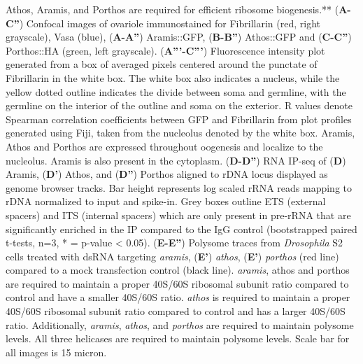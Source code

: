 \documentclass[12pt,oneside]{reedthesis}
\begin{document}
Athos, Aramis, and Porthos are required for efficient
ribosome biogenesis.** (\textbf{A-C''}) Confocal images of ovariole
immunostained for Fibrillarin (red, right grayscale), Vasa (blue),
(\textbf{A-A''}) Aramis::GFP, (\textbf{B-B''}) Athos::GFP and (\textbf{C-C''})
Porthos::HA (green, left grayscale). (\textbf{A'''-C'''}) Fluorescence
intensity plot generated from a box of averaged pixels centered around
the punctate of Fibrillarin in the white box. The white box also
indicates a nucleus, while the yellow dotted outline indicates the
divide between soma and germline, with the germline on the interior of
the outline and soma on the exterior. R values denote Spearman
correlation coefficients between GFP and Fibrillarin from plot profiles
generated using Fiji, taken from the nucleolus denoted by the white box.
Aramis, Athos and Porthos are expressed throughout oogenesis and
localize to the nucleolus. Aramis is also present in the cytoplasm.
(\textbf{D-D''}) RNA IP-seq of (\textbf{D}) Aramis, (\textbf{D'}) Athos, and (\textbf{D''})
Porthos aligned to rDNA locus displayed as genome browser tracks. Bar
height represents log scaled rRNA reads mapping to rDNA normalized to
input and spike-in. Grey boxes outline ETS (external spacers) and ITS
(internal spacers) which are only present in pre-rRNA that are
significantly enriched in the IP compared to the IgG control
(bootstrapped paired t-tests, n=3, * = p-value \textless{} 0.05). (\textbf{E-E''})
Polysome traces from \emph{Drosophila} S2 cells treated with dsRNA targeting
\emph{aramis}, (\textbf{E'}) \emph{athos}, (\textbf{E'}) \emph{porthos} (red line) compared to a
mock transfection control (black line). \emph{aramis}, athos and porthos are
required to maintain a proper 40S/60S ribosomal subunit ratio compared
to control and have a smaller 40S/60S ratio. \emph{athos} is required to
maintain a proper 40S/60S ribosomal subunit ratio compared to control
and has a larger 40S/60S ratio. Additionally, \emph{aramis}, \emph{athos}, and
\emph{porthos} are required to maintain polysome levels. All three helicases
are required to maintain polysome levels. Scale bar for all images is 15
micron.
\end{document}
